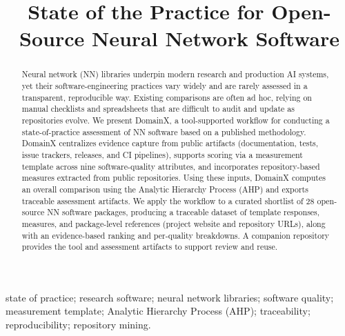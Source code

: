 \documentclass[final,1p,times,authoryear,12pt]{elsarticle}
\providecommand{\wss}[1]{\textcolor{blue}{\textit{#1}}}
\begin{document}
\begin{frontmatter}

\title{State of the Practice for Open-Source Neural Network Software}
\address{Department of Computing and Software \\
McMaster University \\
Hamilton, Ontario, Canada}

\begin{abstract}

Neural network (NN) libraries underpin modern research and production AI systems, yet their software-engineering practices vary 
widely and are rarely assessed in a transparent, reproducible way. Existing comparisons are often ad hoc, relying on manual 
checklists and spreadsheets that are difficult to audit and update as repositories evolve. 
We present DomainX, a tool-supported workflow for conducting a state-of-practice assessment of NN software based on a published
 methodology. DomainX centralizes evidence capture from public artifacts (documentation, tests, issue trackers, releases, and CI pipelines),
  supports scoring via a measurement template across nine software-quality attributes, and incorporates repository-based measures extracted from public repositories. 
  Using these inputs, DomainX computes an overall comparison using the Analytic Hierarchy Process (AHP) and exports traceable assessment artifacts. 
  We apply the workflow to a curated shortlist of 28 open-source NN software packages, producing a traceable dataset of template responses, measures, 
  and package-level references (project website and repository URLs), along with an evidence-based ranking and per-quality breakdowns. A companion repository provides the tool and assessment artifacts to support review 
  and reuse.
\end{abstract}

\begin{keyword}
state of practice; research software; neural network libraries; software quality;
measurement template; Analytic Hierarchy Process (AHP); traceability; reproducibility; repository mining.
\end{keyword}

\end{frontmatter}
\end{document}
